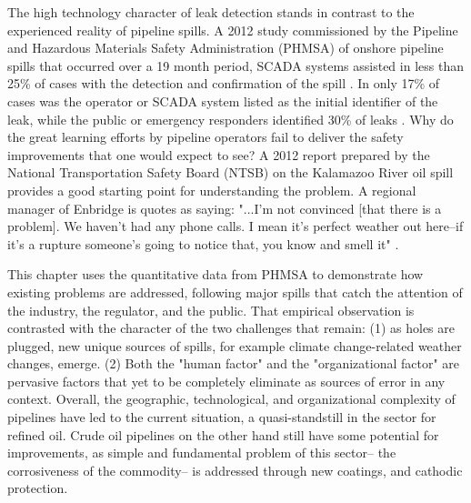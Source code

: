 The high technology character of leak detection stands in contrast to the experienced reality of pipeline spills. A 2012 study commissioned by the Pipeline and Hazardous Materials Safety Administration (PHMSA) of onshore pipeline spills that occurred over a 19 month period, SCADA systems assisted in less than 25\% of cases with the detection and confirmation of the spill \citep[p. 3-33]{Shaw2012}. In only 17\% of cases was the operator or SCADA system listed as the initial identifier of the leak, while the public or emergency responders identified 30\% of leaks \citep[p. 3-39]{Shaw2012}. Why do the great learning efforts by pipeline operators fail to deliver the safety improvements that one would expect to see? A 2012 report prepared by the National Transportation Safety Board (NTSB) on the Kalamazoo River oil spill provides a good starting point for understanding the problem. A regional manager of Enbridge is quotes as saying: "...I'm not convinced [that there is a problem]. We haven't had any phone calls. I mean it's perfect weather out here--if it's a rupture someone's going to notice that, you know and smell it" \citep[p. 100]{NTSB2012}.

This chapter uses the quantitative data from PHMSA to demonstrate how existing problems are addressed, following major spills that catch the attention of the industry, the regulator, and the public. That empirical observation is contrasted with the character of the two challenges that remain: (1) as holes are plugged, new unique sources of spills, for example climate change-related weather changes, emerge. (2) Both the "human factor" and the "organizational factor" are pervasive factors that yet to be completely eliminate as sources of error in any context. Overall, the geographic, technological, and organizational complexity of pipelines have led to the current situation, a quasi-standstill in the sector for refined oil. Crude oil pipelines on the other hand still have some potential for improvements, as simple and fundamental problem of this sector-- the corrosiveness of the commodity-- is addressed through new coatings, and cathodic protection.

